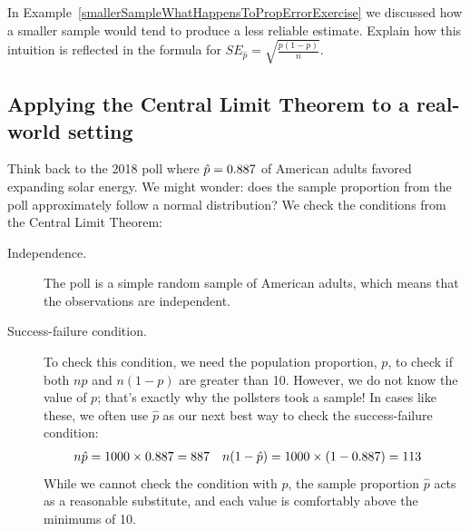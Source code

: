 \begin{exercisewrap}
\begin{nexercise}
In Example~\ref{smallerSampleWhatHappensToPropErrorExercise}
we discussed how a smaller sample would tend
to produce a less reliable estimate. Explain how this intuition
is reflected in the formula for
$SE_{\hat{p}} = \sqrt{\frac{p (1 - p)}{n}}$.\footnotemark
\end{nexercise}
\end{exercisewrap}


\subsection{Applying the Central Limit Theorem to a real-world setting}

Think back to the 2018 poll where
$\hat{p} = 0.887{}$ of American adults favored
expanding solar energy. We might wonder: does the sample
proportion from the poll approximately follow a normal
distribution?
We check the conditions from the Central Limit Theorem:
\begin{description}
\item[Independence.] The poll is a simple random sample of
    American adults, which means that the observations are
    independent.
\item[Success-failure condition.] To check this condition,
    we need the population proportion, $p$, to check if both
    $np$ and $n(1-p)$ are greater than 10. However, we do not
    know the value of $p$; that's exactly why the pollsters
    took a sample! In cases like these, we often use $\hat{p}$
    as our next best way to check the success-failure condition:
    \begin{align*}
    n\hat{p} &= 1000{} \times 0.887{}
        = 887{}
    &n (1 - \hat{p}) &= 1000{} \times (1 - 0.887{})
        = 113{}
    \end{align*}
    While we cannot check the condition with $p$,
    the sample proportion $\hat{p}$ acts as
    a reasonable substitute, and each value is comfortably
    above the minimums of 10.
\end{description}

